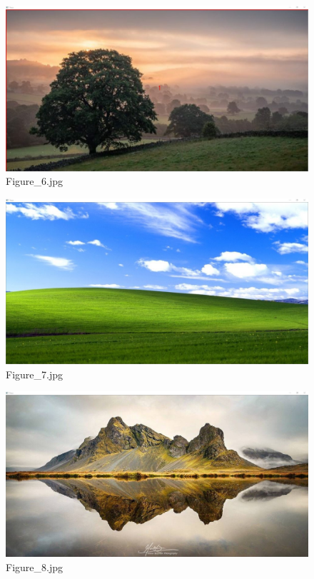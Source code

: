 \documentclass{article}
\begin{document}
\begin{figure}[h]
\begin{center}
\includegraphics[width=1\textwidth]{images/b6}
\caption{\footnotesize{Figure\_6.jpg}}
\label{img:benchmark6}
\end{center}
\end{figure}

\begin{figure}[h]
\begin{center}
\includegraphics[width=1\textwidth]{images/b7}
\caption{\footnotesize{Figure\_7.jpg}}
\label{img:benchmark7}
\end{center}
\end{figure}

\begin{figure}[h]
\begin{center}
\includegraphics[width=1\textwidth]{images/b8}
\caption{\footnotesize{Figure\_8.jpg}}
\label{img:benchmark8}
\end{center}
\end{figure}
\end{document}
